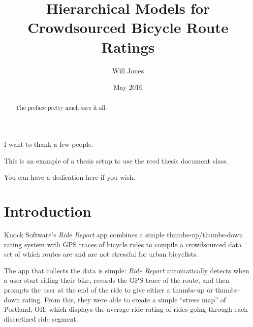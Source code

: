 \documentclass[12pt,twoside]{reedthesis}
\title{Hierarchical Models for Crowdsourced Bicycle Route Ratings}
\author{Will Jones}
\date{May 2016}
\begin{document}
      \maketitle
  
  \frontmatter %
  \pagestyle{empty} %

      \begin{acknowledgements}
      I want to thank a few people.
    \end{acknowledgements}
  
      \begin{preface}
      This is an example of a thesis setup to use the reed thesis document
      class.
    \end{preface}
  

      \hypersetup{linkcolor=black}
    \setcounter{tocdepth}{2}
    \tableofcontents
  
      \listoftables
  
      \listoffigures
  
      \begin{abstract}
      The preface pretty much says it all.
    \end{abstract}
  
      \begin{dedication}
      You can have a dedication here if you wish.
    \end{dedication}
  
  \mainmatter %
  \pagestyle{fancyplain} %

  \chapter*{Introduction}\label{introduction}
  
  Knock Software's \emph{Ride Report} app combines a simple
  thumbs-up/thumbs-down rating system with GPS traces of bicycle rides to
  compile a crowdsourced data set of which routes are and are not
  stressful for urban bicyclists.
  
  The app that collects the data is simple: \emph{Ride Report}
  automatically detects when a user start riding their bike, records the
  GPS trace of the route, and then prompts the user at the end of the ride
  to give either a thumbs-up or thumbs-down rating. From this, they were
  able to create a simple ``stress map'' of Portland, OR, which displays
  the average ride rating of rides going through each discretized ride
  segment.
  
\end{document}
